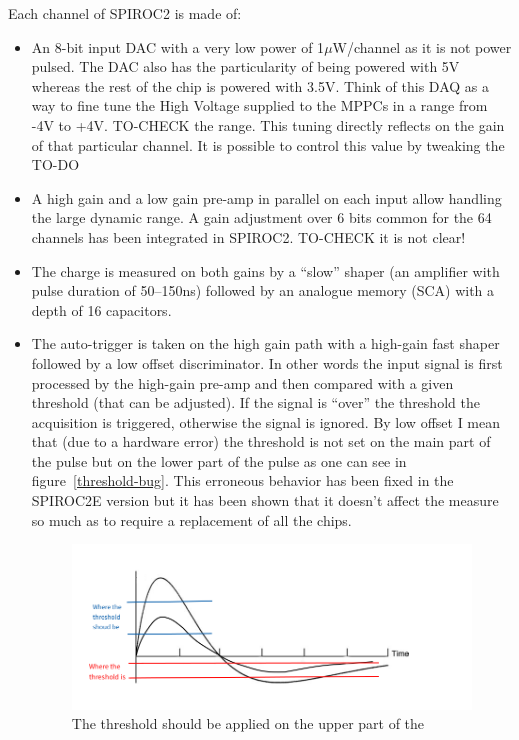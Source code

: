 Each channel of SPIROC2 is made of:
\begin{itemize}
\item An 8-bit input DAC with a very low power of 1$\mu$W/channel as
  it is not power pulsed. The DAC also has the particularity of being
  powered with 5V whereas the rest of the chip is powered with
  3.5V. Think of this DAQ as a way to fine tune the High Voltage
  supplied to the MPPCs in a range from -4V to +4V. TO-CHECK the
  range. This tuning directly reflects on the gain of that particular
  channel. It is possible to control this value by tweaking the TO-DO
\item A high gain and a low gain pre-amp in parallel on each input
  allow handling the large dynamic range. A gain adjustment over 6
  bits common for the 64 channels has been integrated in
  SPIROC2. TO-CHECK it is not clear!
\item The charge is measured on both gains by a ``slow'' shaper (an
  amplifier with pulse duration of 50–150ns) followed by an analogue
  memory (SCA) with a depth of 16 capacitors.
\item The auto-trigger is taken on the high gain path with a high-gain
  fast shaper followed by a low offset discriminator. In other words
  the input signal is first processed by the high-gain pre-amp and
  then compared with a given threshold (that can be adjusted). If the
  signal is ``over'' the threshold the acquisition is triggered,
  otherwise the signal is ignored. By low offset I mean that (due to a
  hardware error) the threshold is not set on the main part of the
  pulse but on the lower part of the pulse as one can see in
  figure~\ref{threshold-bug}. This erroneous behavior has been fixed
  in the SPIROC2E version but it has been shown that it doesn't affect
  the measure so much as to require a replacement of all the chips.
  \begin{figure}
    \includegraphics[width=\linewidth]{threshold-bug.png}
    \caption{The threshold should be applied on the upper part of the
}
\end{figure}
\end{itemize}
